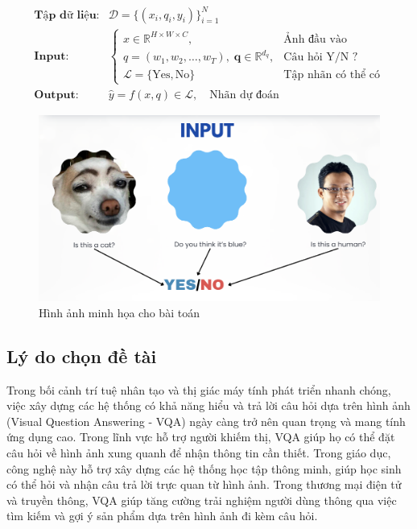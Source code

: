 \vspace{0.5cm}
\[
\begin{array}{ll}
\textbf{Tập dữ liệu:} & \mathcal{D} = \{(x_i, q_i, y_i)\}_{i=1}^N \\[1em]

\textbf{Input:} &
\left\{
\begin{array}{ll}
x \in \mathbb{R}^{H \times W \times C}, & \text{Ảnh đầu vào} \\[2pt]
q = (w_1, w_2, \dots, w_T),\; \mathbf{q} \in \mathbb{R}^{d_q}, & \text{Câu hỏi Y/N ?} \\[2pt]
\mathcal{L} = \{\text{Yes}, \text{No}\} & \text{Tập nhãn có thể có}
\end{array}
\right. \\[1em]

\textbf{Output:} & \hat{y} = f(x, q) \in \mathcal{L}, \quad \text{Nhãn dự đoán}
\end{array}
\]
\vspace{0.5cm}

\begin{figure}[!hbt]
    \centering
    \includegraphics[width=0.85\linewidth]{graphics/chapter1/minhhoa.png}
    \caption{Hình ảnh minh họa cho bài toán}
    \label{fig:MH1}
\end{figure}


\subsection{Lý do chọn đề tài}

Trong bối cảnh trí tuệ nhân tạo và thị giác máy tính phát triển nhanh chóng, việc xây dựng các hệ thống có khả năng hiểu và trả lời câu hỏi dựa trên hình ảnh (Visual Question Answering - VQA) ngày càng trở nên quan trọng và mang tính ứng dụng cao. Trong lĩnh vực hỗ trợ người khiếm thị, VQA giúp họ có thể đặt câu hỏi về hình ảnh xung quanh để nhận thông tin cần thiết. Trong giáo dục, công nghệ này hỗ trợ xây dựng các hệ thống học tập thông minh, giúp học sinh có thể hỏi và nhận câu trả lời trực quan từ hình ảnh. Trong thương mại điện tử và truyền thông, VQA giúp tăng cường trải nghiệm người dùng thông qua việc tìm kiếm và gợi ý sản phẩm dựa trên hình ảnh đi kèm câu hỏi.

